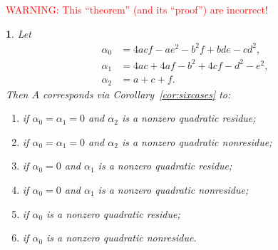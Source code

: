 \documentclass[10pt,a4paper]{amsart}
\numberwithin{equation}{section}
\numberwithin{figure}{section}
\theoremstyle{definition}
\theoremstyle{remark}
\theoremstyle{plain}
\newtheorem{thm}{\protect\theoremname}[section]
\theoremstyle{plain}
\theoremstyle{definition}
\theoremstyle{plain}
\theoremstyle{plain}
\providecommand{\theoremname}{Theorem}
\begin{document}
\textcolor{red}{WARNING: This ``theorem'' (and its ``proof'') are incorrect!}
\begin{thm}
Let
\begin{align*}
\alpha_0&=4acf-ae^2-b^2f+bde-cd^2,\\
\alpha_1&=4ac+4af-b^2+4cf-d^2-e^2,\\
\alpha_2&=a+c+f.
\end{align*}
Then \(A\) corresponds via Corollary~\ref{cor:sixcases} to:
\begin{enumerate}
\item if $\alpha_0=\alpha_1=0$ and $\alpha_2$ is a nonzero quadratic residue;
\item if $\alpha_0=\alpha_1=0$ and $\alpha_2$ is a nonzero quadratic nonresidue;
\item if $\alpha_0=0$ and $\alpha_1$ is a nonzero quadratic residue;
\item if $\alpha_0=0$ and $\alpha_1$ is a nonzero quadratic nonresidue;
\item if $\alpha_0$ is a nonzero quadratic residue;
\item if $\alpha_0$ is a nonzero quadratic nonresidue.
\end{enumerate}
\end{thm}
\end{document}
